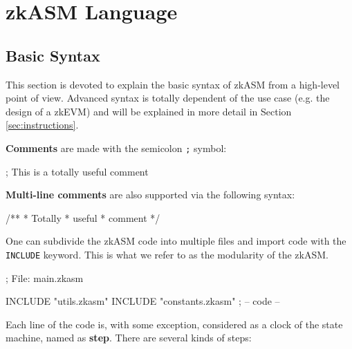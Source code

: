 \section{zkASM Language} 



\subsection{Basic Syntax}

This section is devoted to explain the basic syntax of zkASM from a high-level point of view. Advanced syntax is totally dependent of the use case (e.g. the design of a zkEVM) and will be explained in more detail in Section \ref{sec:instructions}.

\textbf{Comments} are made with the semicolon \texttt{;} symbol:

\begin{zkasm}
    ; This is a totally useful comment
\end{zkasm}

\textbf{Multi-line comments} are also supported via the following syntax:

\begin{zkasm}
/**
* Totally
* useful
* comment
*/
\end{zkasm}

One can subdivide the zkASM code into multiple files and import code with the \texttt{INCLUDE} keyword. This is what we refer to as the modularity of the zkASM.

\begin{zkasm}
    ; File: main.zkasm
    
    INCLUDE "utils.zkasm"
    INCLUDE "constants.zkasm"
    ; -- code --
\end{zkasm}

Each line of the code is, with some exception, considered as a clock of the state machine, named as \textbf{step}. There are several kinds of steps:


